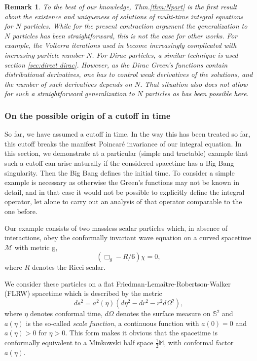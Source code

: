\documentclass[b5paper,draft,openbib,12pt]{memoir}
\newtheorem{Remark}[Def]{Remark}
\newcommand{\M}{\mathbb{M}}
\begin{document}
\begin{Remark}
  To the best of our knowledge, Thm.\@ \ref{thm:Npart} 
  is the first result about the existence and 
  uniqueness of solutions of multi-time integral 
  equations for $N$ particles. While for the present 
  contraction argument the generalization to $N$ 
  particles has been straightforward, this is not 
  the case for other works. For example, the Volterra 
  iterations used in \cite{mtve} become increasingly 
  complicated with increasing particle number $N$. For 
  Dirac particles,  a similar technique is 
  used section \ref{sec:direct dirac}. However, as the Dirac 
  Green's functions contain distributional derivatives, 
  one has to control weak derivatives of the solutions, 
  and the number of such derivatives depends on $N$. 
  That situation also does not allow for such a 
  straightforward generalization to $N$ particles as 
  has been possible here.
\end{Remark}


\subsubsection{On the possible origin of a cutoff in 
time}
\label{sec:KGcurvedspacetime}

So far, we have assumed a cutoff in time. In the way 
this has been treated so far, this cutoff breaks the 
manifest Poincar\'e invariance of our integral 
equation. In this section, we demonstrate at a 
particular (simple and tractable) example that such a 
cutoff can arise naturally if the considered spacetime 
has a Big Bang singularity. Then the Big Bang defines 
the initial time. To consider a simple example is 
necessary as otherwise the Green's functions may not 
be known in detail, and in that case it would not be 
possible to explicitly define the integral operator, 
let alone to carry out an analysis of that operator 
comparable to the one before.

Our example consists of two massless scalar particles 
which, in absence of interactions, obey the conformally 
invariant wave equation on a curved spacetime 
$\mathcal{M}$ with metric g,
\begin{equation}
	\left( \Box_g - R/6 \right) \chi = 0,
	\label{eq:conformalwaveeq}
\end{equation}
where $R$ denotes the Ricci scalar.

We consider these particles on a flat 
Friedman-Lema\^itre-Robertson-Walker (FLRW) spacetime 
which is described by the metric
\begin{equation}
	ds^2 = a^2(\eta) \left( d\eta^2 - dr^2 - r^2 d \Omega^2 \right),
\end{equation}
where $\eta$ denotes conformal time, $d \Omega$ 
denotes the surface measure on $\mathbb{S}^2$ and 
$a(\eta)$ is the so-called \textit{scale function}, a 
continuous function with $a(0) = 0$ and $a(\eta) > 0$ 
for $\eta >0$. This form makes it obvious that the 
spacetime is conformally equivalent to a Minkowski 
half space $\tfrac{1}{2}\M$, with conformal factor 
$a(\eta)$.
\end{document}
